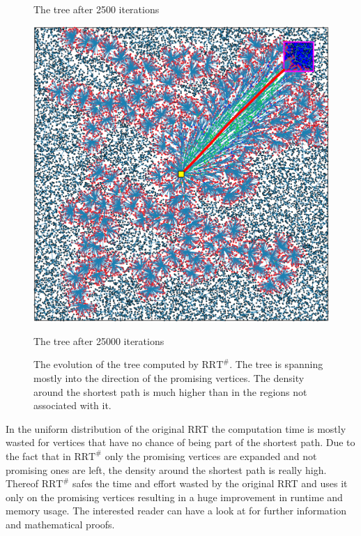 \documentclass[conference]{IEEEtran}
\begin{document}
\begin{figure}[h]
\begin{minipage}[t]{0.3\linewidth}
\caption{The tree after 2500 iterations}
\end{minipage}
\hfill
\begin{minipage}[t]{0.3\linewidth}
\centering
\includegraphics[width=1\textwidth]{images/RRT/ARSLAN/03_v.png}
\caption{The tree after 25000 iterations}
\end{minipage}
\caption{The evolution of the tree computed by $\text{RRT}^\#$. The tree is spanning mostly into the direction of the promising vertices. The density around the shortest path is much higher than in the regions not associated with it.}
\end{figure}

In the uniform distribution of the original RRT the computation time is mostly wasted for vertices that have no chance of being part of the shortest path. Due to the fact that in $\text{RRT}^\#$ only the promising vertices are expanded and not promising ones are left, the density around the shortest path is really high. Thereof $\text{RRT}^\#$ safes the time and effort wasted by the original RRT and uses it only on the promising vertices resulting in a huge improvement in runtime and memory usage.
The interested reader can have a look at \cite{OktayArslan.December2015} for further information and mathematical proofs.

\end{document}
